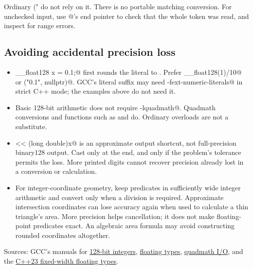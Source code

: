 Ordinary \verb@printf("%Qf", x)@ only works with some C-library hooks;
do not rely on it. There is no portable matching \verb@scanf@ conversion.
For unchecked input, use @'s end pointer to check that the
whole token was read, and inspect \verb@errno@ for range errors.

\subsection{Avoiding accidental precision loss}

\begin{itemize}
\item \verb@__float128 x = 0.1;@ first rounds the literal to \verb@double@.
  Prefer \verb@__float128(1)/10@ or ("0.1", nullptr)@.
  GCC's \verb@Q@ literal suffix may need \verb@-fext-numeric-literals@
  in strict C++ mode; the examples above do not need it.
\item Basic 128-bit arithmetic does not require \verb@-lquadmath@.
  Quadmath conversions and functions such as \verb@sqrtq@ and
  \verb@fabsq@ do. Ordinary \verb@cmath@ overloads are not a substitute.
\item \verb@cout << (long double)x@ is an approximate output shortcut,
  not full-precision binary128 output. Cast only at the end, and only if
  the problem's tolerance permits the loss. More printed digits cannot
  recover precision already lost in a conversion or calculation.
\item For integer-coordinate geometry, keep predicates in sufficiently
  wide integer arithmetic and convert only when a division is required.
  Approximate intersection coordinates can lose accuracy again when used
  to calculate a thin triangle's area. More precision helps cancellation;
  it does not make floating-point predicates exact. An algebraic area
  formula may avoid constructing rounded coordinates altogether.
\end{itemize}

Sources: GCC's manuals for
\href{https://gcc.gnu.org/onlinedocs/gcc/_005f_005fint128.html}{128-bit integers},
\href{https://gcc.gnu.org/onlinedocs/gcc/Floating-Types.html}{floating types},
\href{https://gcc.gnu.org/onlinedocs/libquadmath/I_002fO-Library-Routines.html}{quadmath I/O},
and the \href{https://en.cppreference.com/w/cpp/types/floating-point.html}{C++23 fixed-width floating types}.
